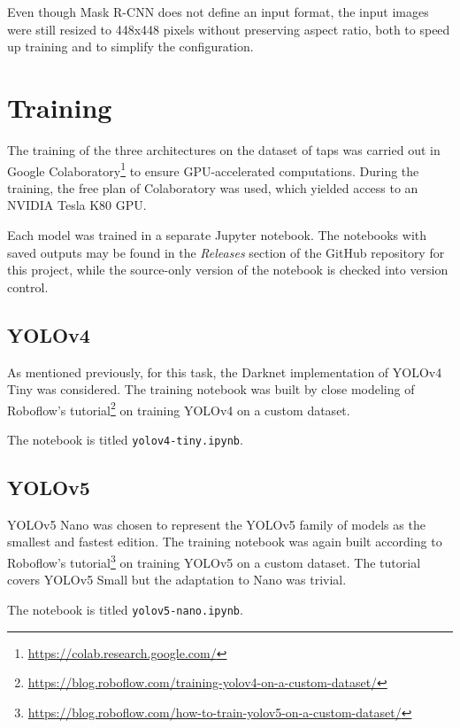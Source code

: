 \documentclass[journal,onecolumn]{IEEEtran}
\begin{document}
Even though Mask R-CNN does not define an input format, the input images were still resized to 448x448 pixels without preserving aspect ratio, both to speed up training and to simplify the configuration.

\section{Training}

The training of the three architectures on the dataset of taps was carried out in Google Colaboratory\footnote{\href{https://colab.research.google.com/}{https://colab.research.google.com/}} to ensure GPU-accelerated computations. During the training, the free plan of Colaboratory was used, which yielded access to an NVIDIA Tesla K80 GPU.

Each model was trained in a separate Jupyter notebook. The notebooks with saved outputs may be found in the \emph{Releases} section of the GitHub repository for this project, while the source-only version of the notebook is checked into version control.

\subsection{YOLOv4}

As mentioned previously, for this task, the Darknet implementation of YOLOv4 Tiny was considered. The training notebook was built by close modeling of Roboflow's tutorial\footnote{\href{https://blog.roboflow.com/training-yolov4-on-a-custom-dataset/}{https://blog.roboflow.com/training-yolov4-on-a-custom-dataset/}} on training YOLOv4 on a custom dataset.

The notebook is titled \texttt{yolov4-tiny.ipynb}.

\subsection{YOLOv5}

YOLOv5 Nano was chosen to represent the YOLOv5 family of models as the smallest and fastest edition. The training notebook was again built according to Roboflow's tutorial\footnote{\href{https://blog.roboflow.com/how-to-train-yolov5-on-a-custom-dataset/}{https://blog.roboflow.com/how-to-train-yolov5-on-a-custom-dataset/}} on training YOLOv5 on a custom dataset. The tutorial covers YOLOv5 Small but the adaptation to Nano was trivial.

The notebook is titled \texttt{yolov5-nano.ipynb}.
\end{document}
